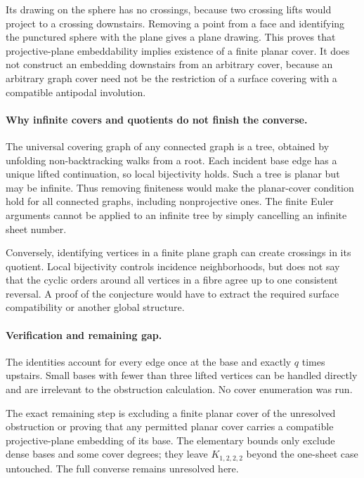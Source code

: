 \documentclass[11pt,a4paper]{article}
\begin{document}
Its drawing on the sphere has no crossings, because two crossing lifts would project to a crossing downstairs. Removing a point from a face and identifying the punctured sphere with the plane gives a plane drawing. This proves that projective-plane embeddability implies existence of a finite planar cover. It does not construct an embedding downstairs from an arbitrary cover, because an arbitrary graph cover need not be the restriction of a surface covering with a compatible antipodal involution.

\paragraph{Why infinite covers and quotients do not finish the converse.}
The universal covering graph of any connected graph is a tree, obtained by unfolding non-backtracking walks from a root. Each incident base edge has a unique lifted continuation, so local bijectivity holds. Such a tree is planar but may be infinite. Thus removing finiteness would make the planar-cover condition hold for all connected graphs, including nonprojective ones. The finite Euler arguments cannot be applied to an infinite tree by simply cancelling an infinite sheet number.

Conversely, identifying vertices in a finite plane graph can create crossings in its quotient. Local bijectivity controls incidence neighborhoods, but does not say that the cyclic orders around all vertices in a fibre agree up to one consistent reversal. A proof of the conjecture would have to extract the required surface compatibility or another global structure.

\paragraph{Verification and remaining gap.}
The identities account for every edge once at the base and exactly $q$ times upstairs. Small bases with fewer than three lifted vertices can be handled directly and are irrelevant to the obstruction calculation. No cover enumeration was run.

The exact remaining step is excluding a finite planar cover of the unresolved obstruction or proving that any permitted planar cover carries a compatible projective-plane embedding of its base. The elementary bounds only exclude dense bases and some cover degrees; they leave $K_{1,2,2,2}$ beyond the one-sheet case untouched. The full converse remains unresolved here.
\end{document}

